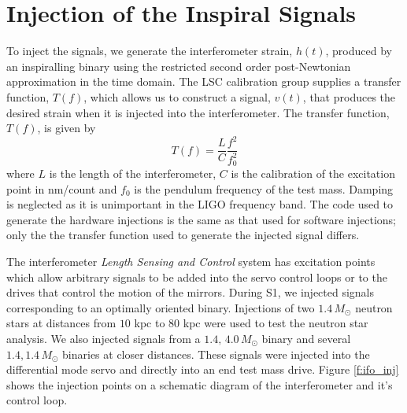 \section{Injection of the Inspiral Signals}
\label{s:injecting}

To inject the signals, we generate the interferometer strain, $h(t)$, produced
by an inspiralling binary using the restricted second order post-Newtonian
approximation in the time domain\cite{Blanchet:1996pi}.  The LSC calibration group
supplies a transfer function, $T(f)$, which allows us to construct a signal,
$v(t)$, that produces the desired strain when it is injected into the
interferometer.  The transfer function, $T(f)$, is given by 
\begin{equation}
T(f) = \frac{L}{C}\frac{f^2}{f_0^2}
\end{equation}
where $L$ is the length of the interferometer, $C$ is the calibration of the
excitation point in nm/count and $f_0$ is the pendulum frequency of the test
mass. Damping is neglected as it is unimportant in the LIGO frequency band.
The code used to generate the hardware injections is the same as that used
for software injections; only the the transfer function used to generate the
injected signal differs.

The interferometer \emph{Length Sensing and Control} system
has excitation points which allow arbitrary signals to be added into the servo
control loops or to the drives that control the motion of the
mirrors\cite{LIGOS1instpaper}. 
During S1, we injected signals corresponding to an optimally oriented binary.
Injections of two $1.4\,M_\odot$ neutron stars at distances from $10$ kpc to
$80$ kpc were used to test the neutron star analysis. 
We also injected signals from a $1.4,\,4.0\,M_\odot$ binary and several
$1.4,1.4\,M_\odot$ binaries at closer distances.  These signals were injected
into the differential mode servo and directly into an end test mass drive.
Figure \ref{f:ifo_inj} shows the injection points on a schematic diagram of
the interferometer and it's control loop.


